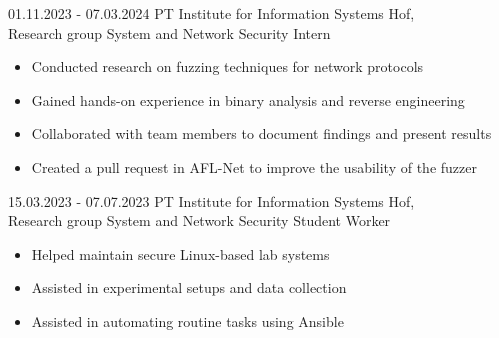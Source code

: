 \pagebreak
\jobentry
{01.11.2023 - 07.03.2024}
{PT}
{Institute for Information Systems Hof, \\ Research group System and Network Security\newline}
{Intern}
{\vspace{-1\baselineskip}
    \begin{itemize}
        \item Conducted research on fuzzing techniques for network protocols
        \item Gained hands-on experience in binary analysis and reverse engineering
        \item Collaborated with team members to document findings and present results
        \item Created a pull request in AFL-Net to improve the usability of the fuzzer
    \end{itemize}
}

\jobentry
{15.03.2023 - 07.07.2023}
{PT}
{Institute for Information Systems Hof, \\ Research group System and Network Security\newline}
{Student Worker}
{\vspace{-1\baselineskip}
    \begin{itemize}
        \item Helped maintain secure Linux-based lab systems
        \item Assisted in experimental setups and data collection
        \item Assisted in automating routine tasks using Ansible
    \end{itemize}
}



